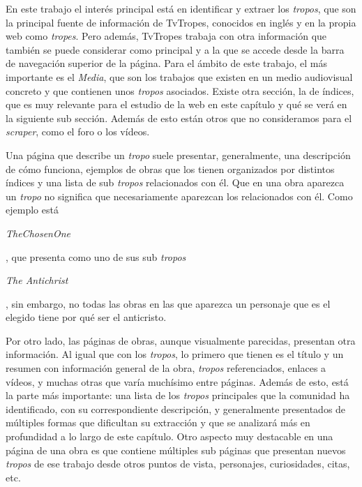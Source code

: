 En este trabajo el interés principal está en identificar y extraer los
\textit{tropos}, que son la principal fuente de información de TvTropes,
conocidos en inglés y en la propia web como \textit{tropes}. Pero además,
TvTropes trabaja con otra información que también se puede considerar como
principal y a la que se accede desde la barra de navegación superior de la
página. Para el ámbito de este trabajo, el más importante es el \textit{Media},
que son los trabajos que existen en un medio audiovisual concreto y que
contienen unos \textit{tropos} asociados. Existe otra sección, la de índices,
que es muy relevante para el estudio de la web en este capítulo y qué se verá en
la siguiente sub sección. Además de esto están otros que no consideramos para el
\textit{scraper}, como el foro o los vídeos.

Una página que describe un \textit{tropo} suele presentar, generalmente, una
descripción de cómo funciona, ejemplos de obras que los tienen organizados por
distintos índices y una lista de sub \textit{tropos} relacionados con él. Que en
una obra aparezca un \textit{tropo} no significa que necesariamente aparezcan
los relacionados con él. Como ejemplo está
\begin{otherlanguage}{english}\textit{TheChosenOne}\end{otherlanguage}, que
presenta como uno de sus sub \textit{tropos}
\begin{otherlanguage}{english}\textit{The Antichrist}\end{otherlanguage}, sin
embargo, no todas las obras en las que aparezca un personaje que es el elegido
tiene por qué ser el anticristo.

Por otro lado, las páginas de obras, aunque visualmente parecidas, presentan
otra información. Al igual que con los \textit{tropos}, lo primero que tienen es
el título y un resumen con información general de la obra, \textit{tropos}
referenciados, enlaces a vídeos, y muchas otras que varía muchísimo entre
páginas. Además de esto, está la parte más importante: una lista de los
\textit{tropos} principales que la comunidad ha identificado, con su
correspondiente descripción, y generalmente presentados de múltiples formas que
dificultan su extracción y que se analizará más en profundidad a lo largo de
este capítulo. Otro aspecto muy destacable en una página de una obra es que
contiene múltiples sub páginas que presentan nuevos \textit{tropos} de ese
trabajo desde otros puntos de vista, personajes, curiosidades, citas, etc.

